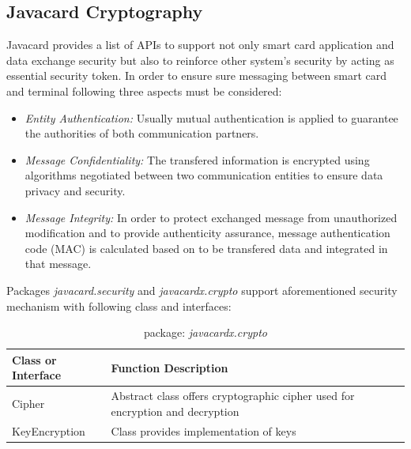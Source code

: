 \subsection{Javacard Cryptography}
Javacard provides a list of APIs to support not only smart card application and data exchange security but also to reinforce other system's security by acting as essential security token. 
In order to ensure sure messaging between smart card and terminal following three aspects must be considered:
\begin{itemize}
\item \emph{Entity Authentication:} Usually mutual authentication is applied to guarantee the authorities of both communication partners.
\item \emph{Message Confidentiality:} The transfered information is encrypted using algorithms negotiated between two communication entities to ensure data privacy and security.
\item \emph{Message Integrity:} In order to protect exchanged message from unauthorized modification and to provide authenticity assurance, message authentication code (MAC) is calculated based on to be transfered data and integrated in that message.
\end{itemize}
Packages \emph{javacard.security} and \emph{javacardx.crypto} support aforementioned security mechanism with following class and interfaces\cite{chen}:

\begin{table}[ht]
\caption{package: \emph{javacardx.crypto}}
\centering
\begin{tabular}{lllll}
\hline
 Class or Interface & Function Description\\
\hline\hline
Cipher & Abstract class offers cryptographic cipher used for encryption and decryption\\
KeyEncryption & Class provides implementation of keys\\
\hline
\end{tabular}
\label{table:javacardx-crypto}
\end{table}

